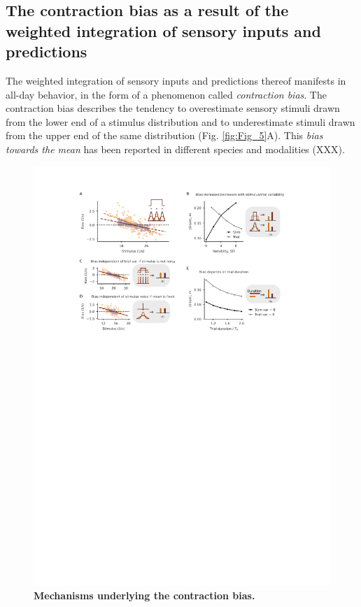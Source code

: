 \documentclass[10pt,a4paper]{article}
\begin{document}
\subsection*{The contraction bias as a result of the weighted integration of sensory inputs and predictions}
% 
The weighted integration of sensory inputs and predictions thereof manifests in all-day behavior, in the form of a phenomenon called \textit{contraction bias}. The contraction bias describes the tendency to overestimate sensory stimuli drawn from the lower end of a stimulus distribution and to underestimate stimuli drawn from the upper end of the same distribution (Fig. \ref{fig:Fig_5}A). This \textit{bias towards the mean} has been reported in different species and modalities (XXX). 
%
\begin{figure}[t!]
	\centering
    \includegraphics{../results/figures/final/Fig_5}
\caption{\footnotesize{\bf Mechanisms underlying the contraction bias.\newline} 
}
\end{figure}
\end{document}
